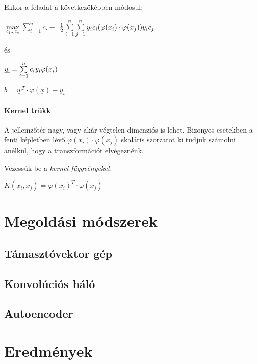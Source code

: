 \noindent
Ekkor a feladat a következőképpen módosul:

$ \max\limits_{c_1 \dots c_n} \sum\limits_{i=1}^{n}c_i -  $
$ \frac{1}{2}\sum\limits_{{i}=1}^{n}\sum\limits_{{j}=1}^{n} y_i c_i (\varphi(x_i) \cdot \varphi(x_j)) y_i c_j $

\noindent
és

$ \underline{w} = \sum\limits_{{i}=1}^{n} c_i y_i \varphi(x_i) $

$ b = \underline{w}^T \cdot \varphi(\underline{x})  - y_i$




\paragraph{Kernel trükk} 

A jellemzőtér nagy, vagy akár végtelen dimenziós is lehet. Bizonyos esetekben a fenti képletben lévő
$ \varphi(x_i) \cdot \varphi(x_j) $ skaláris szorzatot ki tudjuk számolni anélkül, hogy a transzformációt 
elvégeznénk.



\noindent
Vezessük be a \textit{kernel függvényeket}:

$ K(x_i, x_j) = \varphi(x_i)^T \cdot \varphi(x_j) $




















\section{Megoldási módszerek}
\subsection{Támasztóvektor gép}
\subsection{Konvolúciós háló}
\subsection{Autoencoder}
\section{Eredmények}



